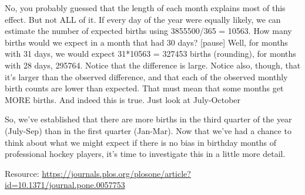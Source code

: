 \documentclass[]{book}
\begin{document}
No, you probably guessed that the length of each month explains most of this effect. But not ALL of it. If every day of the year were equally likely, we can estimate the number of expected births using 3855500/365 = 10563. How many births would we expect in a month that had 30 days? {[}pause{]} Well, for months with 31 days, we would expect 31*10563 = 327453 births (rounding), for months with 28 days, 295764. Notice that the difference is large. Notice also, though, that it's larger than the observed difference, and that each of the observed monthly birth counts are lower than expected. That must mean that some months get MORE births. And indeed this is true. Just look at July-October

So, we've established that there are more births in the third quarter of the year (July-Sep) than in the first quarter (Jan-Mar). Now that we've had a chance to think about what we might expect if there is no bias in birthday months of professional hockey players, it's time to investigate this in a little more detail.

Resource: \url{https://journals.plos.org/plosone/article?id=10.1371/journal.pone.0057753}


\end{document}
